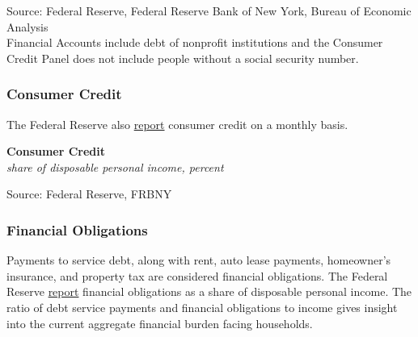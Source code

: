 \documentclass{report}
\makeatletter
\newcommand{\tbllink}[1]{\href{https://raw.githubusercontent.com/bdecon/US-chartbook/master/chartbook/data/#1}{\faTable}}
\newcommand*\short[1]{\expandafter\@gobbletwo\number\numexpr#1\relax}
\newcommand{\absnode}[3]{\node[below right, align=left] at (axis cs: #1,#2) {#3};}
\newcommand{\dateaxisticks}{
		date coordinates in=x, axis line style={draw=none},
		xmax={2023-11-01},
		max space between ticks=40,	    
		xtick={{1990-01-01}, {1992-01-01}, {1994-01-01}, 
			{1996-01-01}, {1998-01-01}, {2000-01-01}, 
			{2002-01-01}, {2004-01-01}, {2006-01-01},
			{2008-01-01}, {2010-01-01}, {2012-01-01}, {2014-01-01},
		    {2016-01-01}, {2018-01-01}, {2020-01-01}, {2022-01-01}, 
		    {2024-01-01}, {2026-01-01}},
		minor xtick={{1989-01-01}, {1991-01-01}, {1993-01-01},
			{1995-01-01}, {1997-01-01}, {1999-01-01}, 
			{2001-01-01}, {2003-01-01}, {2005-01-01}, {2007-01-01},
		    {2009-01-01}, {2011-01-01}, {2013-01-01}, {2015-01-01},
		    {2017-01-01}, {2019-01-01}, {2021-01-01}, {2023-01-01}, 
		    {2025-01-01}, {2027-01-01}},
		enlarge y limits={0.06}, enlarge x limits={0.01},
		}
\newcommand{\bbar}[2]{extra #1 ticks = {{#2}}, extra #1 tick labels = ,
		extra #1 tick style = {grid=major, grid style={thick, black!25}},}
\newcommand{\stdline}[4]{\addplot[very thick, no markers, color=#1] 
		table [x=#2, y=#3, col sep=comma] {#4};	}
\newcommand{\thickline}[4]{\addplot[ultra thick, no markers, color=#1] 
		table [x=#2, y=#3, col sep=comma] {#4};	}
\newcommand{\rbars}{
		\fill[color=black!10] (axis cs:{1990-07-01},\pgfkeysvalueof{/pgfplots/ymin}) rectangle 
			(axis cs:{1991-03-01}, \pgfkeysvalueof{/pgfplots/ymax});
		\fill[color=black!10] (axis cs:{2007-12-01},\pgfkeysvalueof{/pgfplots/ymin}) rectangle 
			(axis cs:{2009-07-01}, \pgfkeysvalueof{/pgfplots/ymax});
		\fill[color=black!10] (axis cs:{2001-03-01},\pgfkeysvalueof{/pgfplots/ymin}) rectangle 
			(axis cs:{2001-11-01}, \pgfkeysvalueof{/pgfplots/ymax});
		\fill[color=black!10] (axis cs:{2020-02-01},\pgfkeysvalueof{/pgfplots/ymin}) rectangle 
			(axis cs:{2020-05-01}, \pgfkeysvalueof{/pgfplots/ymax});}
\makeatother
\begin{document}
{\begin{minipage}{0.76\textwidth}
\footnotesize{Source: Federal Reserve, Federal Reserve Bank of New York, Bureau of Economic Analysis}\\
\footnotesize{Financial Accounts include debt of nonprofit institutions and the Consumer Credit Panel does not include people without a social security number.}
\end{minipage}
\newpage
\vspace*{-10mm}

\begin{minipage}{0.76\textwidth}  
\subsubsection*{Consumer Credit}

\small The Federal Reserve also \href{https://www.federalreserve.gov/releases/g19/current/default.htm}{report} consumer credit on a monthly basis. 



\normalsize \textbf{Consumer Credit}\\
\footnotesize{\textit{share of disposable personal income, percent}}
\vspace{3.3cm}

\hspace{3mm} 

\footnotesize{Source: Federal Reserve, FRBNY} \hfill \tbllink{cc_dpi_monthly.csv} \tbllink{hhcdebt.csv}
\vspace{3mm}
\subsubsection*{Financial Obligations}  
\small Payments to service debt, along with rent, auto lease payments, homeowner's insurance, and property tax are considered financial obligations. The Federal Reserve \href{https://www.federalreserve.gov/releases/housedebt/default.htm}{report} financial obligations as a share of disposable personal income. The ratio of debt service payments and financial obligations to income gives insight into the current aggregate financial burden facing households. 
\end{minipage}

}
\end{document}
